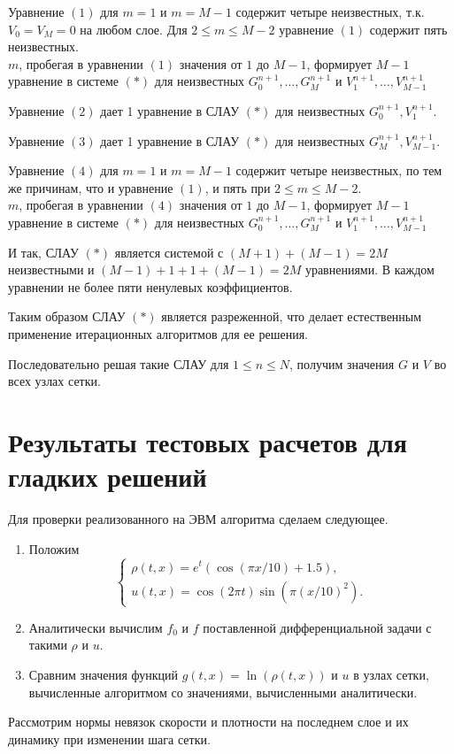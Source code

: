 \documentclass[11pt]{article}
\begin{document}
Уравнение $(1)$ для $m = 1$ и $m=M-1$ содержит четыре неизвестных, т.к. $V_0 = V_M = 0$ на любом слое. Для $2 \leqslant m \leqslant M - 2$ уравнение $(1)$ содержит пять неизвестных.\\ 
$m$, пробегая в уравнении $(1)$ значения от $1$ до $M - 1$, формирует $M-1$ уравнение в системе $(*)$ для неизвестных $G_0^{n+1}, \ldots , G_M^{n+1}$ и $V_1^{n+1}, \ldots , V_{M-1}^{n+1}$

Уравнение $(2)$ дает 1 уравнение в СЛАУ $(*)$ для неизвестных $G_0^{n+1}, V_1^{n+1}$.

Уравнение $(3)$ дает 1 уравнение в СЛАУ $(*)$ для неизвестных $G_M^{n+1}, V_{M-1}^{n+1}$.

Уравнение $(4)$ для $m =1$ и $m = M-1$ содержит четыре неизвестных, по тем же причинам, что и уравнение $(1)$, и пять при $2 \leqslant m \leqslant M - 2$.\\
$m$, пробегая в уравнении $(4)$ значения от $1$ до $M - 1$, формирует $M-1$ уравнение в системе $(*)$ для неизвестных $G_0^{n+1}, \ldots , G_M^{n+1}$ и $V_1^{n+1}, \ldots , V_{M-1}^{n+1}$

И так, СЛАУ $(*)$ является системой с $(M+1) + (M-1) = 2M$ неизвестными и $(M-1) + 1 + 1 + (M-1) = 2M$ уравнениями. В каждом уравнении не более пяти ненулевых коэффициентов.

Таким образом СЛАУ $(*)$ является разреженной, что делает естественным применение итерационных алгоритмов для ее решения.

Последовательно решая такие СЛАУ для $1 \leqslant n \leqslant N$, получим значения $G$ и $V$ во всех узлах сетки.

\section{Результаты тестовых расчетов для гладких решений}
Для проверки реализованного на ЭВМ алгоритма сделаем следующее.
\begin{enumerate}
\item Положим 
$$
\begin{cases}
\rho (t, x) = e^t (\cos (\pi x / 10) + 1.5), \\
u (t, x) = \cos (2 \pi t) \sin (\pi (x/10)^2).
\end{cases}
$$
\item Аналитически вычислим $f_0$ и $f$ поставленной дифференциальной задачи с такими $\rho$ и $u$.
\item Сравним значения функций $g (t, x) = \ln (\rho (t, x))$ и $u$ в узлах сетки, вычисленные алгоритмом со значениями, вычисленными аналитически.
\end{enumerate}
Рассмотрим нормы невязок скорости и плотности на последнем слое и их динамику при изменении шага сетки.
\enlargethispage{5\baselineskip}\\
\end{document}
